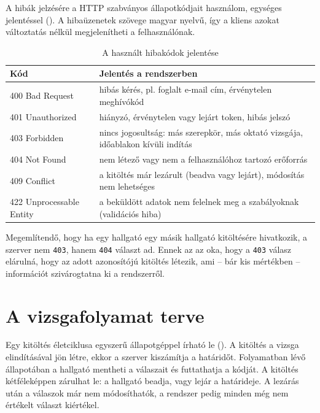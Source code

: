 A hibák jelzésére a HTTP szabványos állapotkódjait használom, egységes jelentéssel
(). A hibaüzenetek szövege magyar nyelvű, így a kliens azokat
változtatás nélkül megjelenítheti a felhasználónak.

\begin{table}[H]
  \centering
  \caption{A használt hibakódok jelentése}
  \label{tab:statuszkodok}
  \small
  \begin{tabularx}{\textwidth}{@{}lX@{}}
    \toprule
    Kód & Jelentés a rendszerben \\
    \midrule
    400 Bad Request          & hibás kérés, pl. foglalt e-mail cím, érvénytelen meghívókód \\
    401 Unauthorized         & hiányzó, érvénytelen vagy lejárt token, hibás jelszó \\
    403 Forbidden            & nincs jogosultság: más szerepkör, más oktató vizsgája, időablakon kívüli indítás \\
    404 Not Found            & nem létező vagy nem a felhasználóhoz tartozó erőforrás \\
    409 Conflict             & a kitöltés már lezárult (beadva vagy lejárt), módosítás nem lehetséges \\
    422 Unprocessable Entity & a beküldött adatok nem felelnek meg a szabályoknak (validációs hiba) \\
    \bottomrule
  \end{tabularx}
\end{table}

Megemlítendő, hogy ha egy hallgató egy másik hallgató kitöltésére hivatkozik, a szerver nem
\texttt{403}, hanem \texttt{404} választ ad. Ennek az az oka, hogy a \texttt{403} válasz elárulná,
hogy az adott azonosítójú kitöltés létezik, ami -- bár kis mértékben -- információt szivárogtatna
ki a rendszerről.

\section{A vizsgafolyamat terve}
\label{sec:folyamat}

Egy kitöltés életciklusa egyszerű állapotgéppel írható le (). A kitöltés a
vizsga elindításával jön létre, ekkor a szerver kiszámítja a határidőt. Folyamatban lévő
állapotában a hallgató mentheti a válaszait és futtathatja a kódját. A kitöltés kétféleképpen
zárulhat le: a hallgató beadja, vagy lejár a határideje. A lezárás után a válaszok már nem
módosíthatók, a rendszer pedig minden még nem értékelt választ kiértékel.


